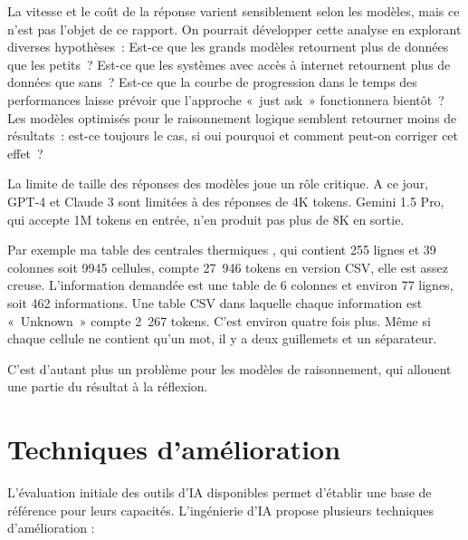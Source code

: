 \documentclass[a4paper,11pt]{report}
\begin{document}
La vitesse et le coût de la réponse varient sensiblement selon les modèles, mais ce n'est pas l'objet de ce rapport. On pourrait développer cette analyse en explorant diverses hypothèses~: Est-ce que les grands modèles retournent plus de données que les petits~? Est-ce que les systèmes avec accès à internet retournent plus de données que sans~? Est-ce que la courbe de progression dans le temps des performances laisse prévoir que l'approche «~just ask~» fonctionnera bientôt~? Les modèles optimisés pour le raisonnement logique semblent retourner moins de résultats~: est-ce toujours le cas, si oui pourquoi et comment peut-on corriger cet effet~?

La limite de taille des réponses des modèles joue un rôle critique. A ce jour, GPT-4 et Claude 3 sont limitées à des réponses de 4K tokens. Gemini 1.5 Pro, qui accepte 1M tokens en entrée, n'en produit pas plus de 8K en sortie.

Par exemple ma table des centrales thermiques \citep{NLN8GPNI}, qui contient 255 lignes et 39 colonnes soit 9945 cellules, compte 27~946 tokens en version CSV, elle est assez creuse. L'information demandée est une table de 6 colonnes et environ 77 lignes, soit 462 informations. Une table CSV dans laquelle chaque information est «~Unknown~» compte 2~267 tokens. C'est environ quatre fois plus. Même si chaque cellule ne contient qu'un mot, il y a deux guillemets et un séparateur.

C'est d'autant plus un problème pour les modèles de raisonnement, qui allouent une partie du résultat à la réflexion.

\section{Techniques d'amélioration}\label{techniques-damuxe9lioration}

L'évaluation initiale des outils d'IA disponibles permet d'établir une base de référence pour leurs capacités. L'ingénierie d'IA propose plusieurs techniques d'amélioration :
\end{document}
